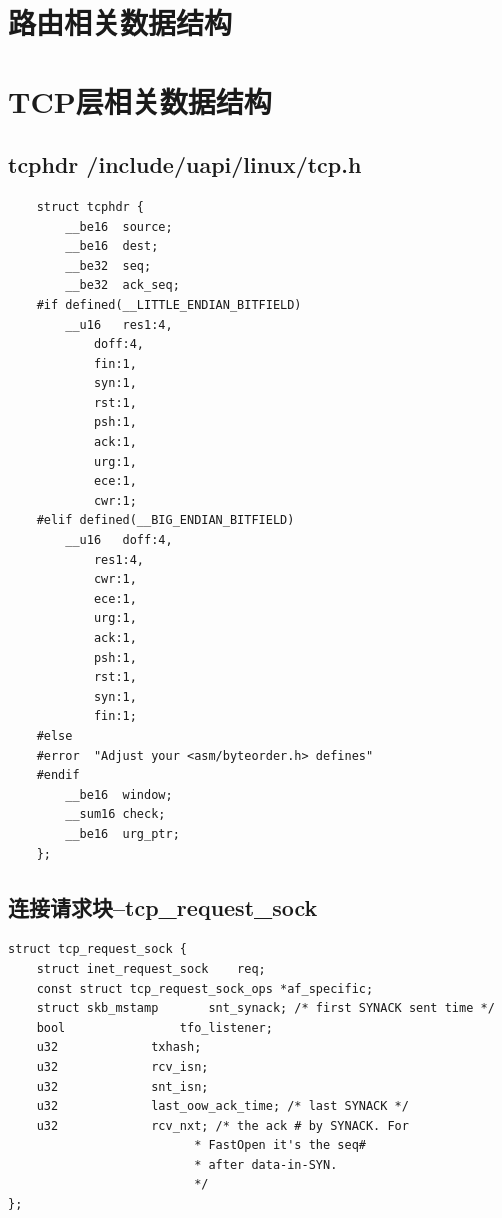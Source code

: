 \documentclass[11pt, a4paper,oneside]{book}
\theoremstyle{ocrenumbox}
\theoremstyle{purplenumbox}
\theoremstyle{blackbox}
\begin{document}
	\section{路由相关数据结构}

	\section{TCP层相关数据结构}
		\subsection{tcphdr /include/uapi/linux/tcp.h}
\begin{verbatim}
	struct tcphdr {
		__be16	source;
		__be16	dest;
		__be32	seq;
		__be32	ack_seq;
	#if defined(__LITTLE_ENDIAN_BITFIELD)
		__u16	res1:4,
			doff:4,
			fin:1,
			syn:1,
			rst:1,
			psh:1,
			ack:1,
			urg:1,
			ece:1,
			cwr:1;
	#elif defined(__BIG_ENDIAN_BITFIELD)
		__u16	doff:4,
			res1:4,
			cwr:1,
			ece:1,
			urg:1,
			ack:1,
			psh:1,
			rst:1,
			syn:1,
			fin:1;
	#else
	#error	"Adjust your <asm/byteorder.h> defines"
	#endif	
		__be16	window;
		__sum16	check;
		__be16	urg_ptr;
	};
\end{verbatim}	
	
		\subsection{连接请求块--tcp\_request\_sock}
\begin{verbatim}
struct tcp_request_sock {
	struct inet_request_sock 	req;
	const struct tcp_request_sock_ops *af_specific;
	struct skb_mstamp		snt_synack; /* first SYNACK sent time */
	bool				tfo_listener;
	u32				txhash;
	u32				rcv_isn;
	u32				snt_isn;
	u32				last_oow_ack_time; /* last SYNACK */
	u32				rcv_nxt; /* the ack # by SYNACK. For
						  * FastOpen it's the seq#
						  * after data-in-SYN.
						  */
};
\end{verbatim}
\end{document}
